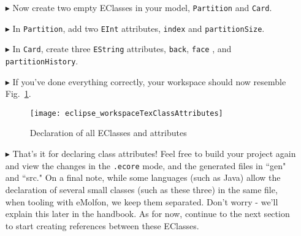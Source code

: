 \begin{itemize}
\newpage

\item[$\blacktriangleright$] Now create two empty EClasses in your model, \texttt{Partition} and \texttt{Card}.

\item[$\blacktriangleright$] In \texttt{Partition}, add two \texttt{EInt} attributes, \texttt{index} and \texttt{partitionSize}.

\item[$\blacktriangleright$] In \texttt{Card}, create three \texttt{EString} attributes, \texttt{back}, \texttt{face} , and \texttt{partitionHistory}.

\item[$\blacktriangleright$] If you've done everything correctly, your workspace should now resemble Fig.~\ref{fig:workspaceClassAttributes}.

\vspace{0.5cm}

\begin{figure}[htbp]
	\centering
  \texttt{[image: eclipse\_workspaceTexClassAttributes]}
	\caption{Declaration of all EClasses and attributes}
	\label{fig:workspaceClassAttributes}
\end{figure} 

\vspace{0.5cm}

\item[$\blacktriangleright$] That's it for declaring class attributes! Feel free to build your project again and view the changes in the \texttt{.ecore}
mode, and the generated files in ``gen" and ``src." On a final note, while some languages (such as Java) allow the declaration of several small classes (such as
these three) in the same file, when tooling with eMolfon, we keep them separated. Don't worry - we'll explain this later in the handbook. As for now, continue
to the next section to start creating references between these EClasses.


\end{itemize}

